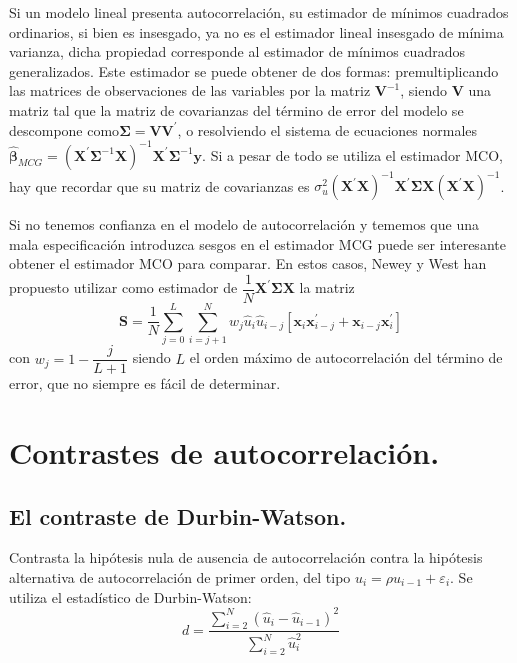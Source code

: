 Si un modelo lineal presenta autocorrelaci\'on, su estimador de m\'inimos
cuadrados ordinarios, si bien es insesgado, ya no es el estimador
lineal insesgado de m\'inima varianza, dicha propiedad corresponde al
estimador de m\'inimos cuadrados generalizados. Este estimador se puede
obtener de dos formas: premultiplicando las matrices de observaciones
de las variables por la matriz $\boldsymbol{V}^{-1}$, siendo $\boldsymbol{V}$
una matriz tal que la matriz de covarianzas del t\'ermino de error del
modelo se descompone como$\boldsymbol{\Sigma}=\boldsymbol{V}\boldsymbol{V}^{\prime}$,
o resolviendo el sistema de ecuaciones normales $\hat{\boldsymbol{\beta}}_{MCG}=\left(\boldsymbol{X}^{\prime}\boldsymbol{\Sigma}^{-1}\boldsymbol{X}\right)^{-1}\boldsymbol{X}^{\prime}\boldsymbol{\Sigma}^{-1}\boldsymbol{y}$.
Si a pesar de todo se utiliza el estimador MCO, hay que recordar que
su matriz de covarianzas es $\sigma_{u}^{2}\left(\boldsymbol{X}^{\prime}\boldsymbol{X}\right)^{-1}\boldsymbol{X}^{\prime}\boldsymbol{\Sigma}\boldsymbol{X}\left(\boldsymbol{X}^{\prime}\boldsymbol{X}\right)^{-1}$.

Si no tenemos confianza en el modelo de autocorrelaci\'on y tememos
que una mala especificaci\'on introduzca sesgos en el estimador MCG
puede ser interesante obtener el estimador MCO para comparar. En estos
casos, Newey y West han propuesto utilizar como estimador de $\dfrac{1}{N}\boldsymbol{X}^{\prime}\boldsymbol{\Sigma}\boldsymbol{X}$
la matriz 
\[
\boldsymbol{S}=\dfrac{1}{N}\sum_{j=0}^{L}\sum_{i=j+1}^{N}w_{j}\hat{u}_{i}\hat{u}_{i-j}\left[\boldsymbol{x}_{i}\boldsymbol{x}_{i-j}^{\prime}+\boldsymbol{x}_{i-j}\boldsymbol{x}_{i}^{\prime}\right]
\]
con $w_{j}=1-\dfrac{j}{L+1}$ siendo $L$ el orden m\'aximo de autocorrelaci\'on
del t\'ermino de error, que no siempre es f\'acil de determinar.


\section{Contrastes de autocorrelaci\'on.}


\subsection{El contraste de Durbin-Watson.}

Contrasta la hip\'otesis nula de ausencia de autocorrelaci\'on contra
la hip\'otesis alternativa de autocorrelaci\'on de primer orden, del tipo
$u_{i}=\rho u_{i-1}+\varepsilon_{i}$. Se utiliza el estad\'istico de
Durbin-Watson: 
\[
d=\dfrac{\sum_{i=2}^{N}\left(\hat{u}_{i}-\hat{u}_{i-1}\right)^{2}}{\sum_{i=2}^{N}\hat{u}_{i}^{2}}
\]


